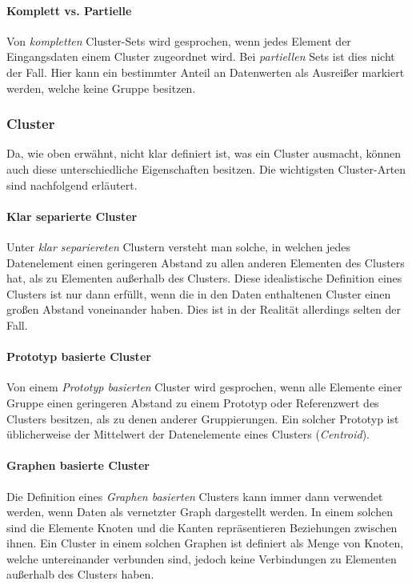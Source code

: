 \paragraph{Komplett vs. Partielle}
Von \textit{kompletten} Cluster-Sets wird gesprochen, wenn jedes Element der Eingangsdaten einem Cluster zugeordnet wird.
Bei \textit{partiellen} Sets ist dies nicht der Fall. Hier kann ein bestimmter Anteil an Datenwerten als Ausreißer markiert
werden, welche keine Gruppe besitzen.


\subsubsection{Cluster}

Da, wie oben erwähnt, nicht klar definiert ist, was ein Cluster ausmacht, können auch diese unterschiedliche Eigenschaften
besitzen. Die wichtigsten Cluster-Arten sind nachfolgend erläutert.

\paragraph{Klar separierte Cluster}
Unter \textit{klar separiereten} Clustern versteht man solche, in welchen jedes Datenelement einen geringeren
Abstand zu allen anderen Elementen des Clusters hat, als zu Elementen außerhalb des Clusters. Diese
idealistische Definition eines Clusters ist nur dann erfüllt, wenn die in den Daten enthaltenen Cluster einen
großen Abstand voneinander haben. Dies ist in der Realität allerdings selten der Fall.

\paragraph{Prototyp basierte Cluster}
Von einem \textit{Prototyp basierten} Cluster wird gesprochen, wenn alle Elemente einer Gruppe einen
geringeren Abstand zu einem Prototyp oder Referenzwert des Clusters besitzen, als zu denen anderer Gruppierungen.
Ein solcher Prototyp ist üblicherweise der Mittelwert der Datenelemente eines Clusters (\textit{Centroid}).

\paragraph{Graphen basierte Cluster}
Die Definition eines \textit{Graphen basierten} Clusters kann immer dann verwendet werden, wenn Daten
als vernetzter Graph dargestellt werden. In einem solchen sind die Elemente Knoten und die Kanten
repräsentieren Beziehungen zwischen ihnen. Ein Cluster in einem solchen Graphen ist definiert als Menge von
Knoten, welche untereinander verbunden sind, jedoch keine Verbindungen zu Elementen außerhalb des Clusters haben.

